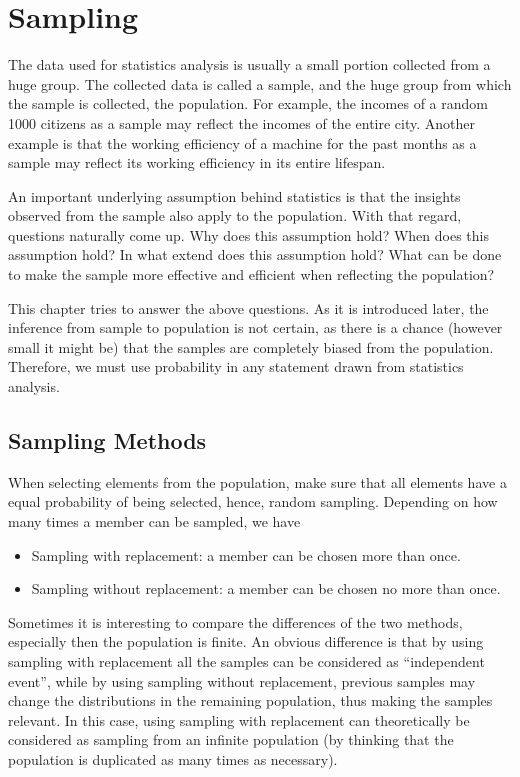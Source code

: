 \chapter{Sampling} \label{ch:sampling}

The data used for statistics analysis is usually a small portion collected from a huge group. The collected data is called a sample, and the huge group from which the sample is collected, the population. For example, the incomes of a random 1000 citizens as a sample may reflect the incomes of the entire city. Another example is that the working efficiency of a machine for the past months as a sample may reflect its working efficiency in its entire lifespan.

An important underlying assumption behind statistics is that the insights observed from the sample also apply to the population. With that regard, questions naturally come up. Why does this assumption hold? When does this assumption hold? In what extend does this assumption hold? What can be done to make the sample more effective and efficient when reflecting the population?

This chapter tries to answer the above questions. As it is introduced later, the inference from sample to population is not certain, as there is a chance (however small it might be) that the samples are completely biased from the population. Therefore, we must use probability in any statement drawn from statistics analysis.

\section{Sampling Methods}

When selecting elements from the population, make sure that all elements have a equal probability of being selected, hence, random sampling. Depending on how many times a member can be sampled, we have
\begin{itemize}
  \item Sampling with replacement: a member can be chosen more than once.
  \item Sampling without replacement: a member can be chosen no more than once.
\end{itemize}

Sometimes it is interesting to compare the differences of the two methods, especially then the population is finite. An obvious difference is that by using sampling with replacement all the samples can be considered as ``independent event'', while by using sampling without replacement, previous samples may change the distributions in the remaining population, thus making the samples relevant. In this case, using sampling with replacement can theoretically be considered as sampling from an infinite population (by thinking that the population is duplicated as many times as necessary).


